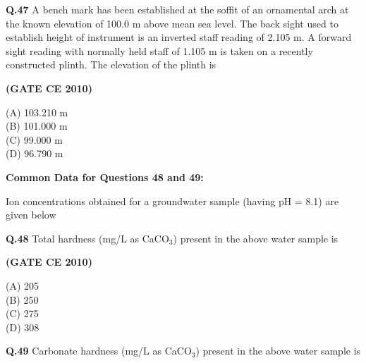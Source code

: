 \documentclass[journal,12pt,onecolumn]{exam}
\theoremstyle{remark}
\begin{document}
\noindent\textbf{Q.47} A bench mark has been established at the soffit of an ornamental arch at the known elevation of 100.0 m above mean sea level. The back sight used to establish height of instrument is an inverted staff reading of 2.105 m. A forward sight reading with normally held staff of 1.105 m is taken on a recently constructed plinth. The elevation of the plinth is

\setlength{\parskip}{0.5cm}

\hfill\textbf{(GATE CE 2010)}

\begin{multicols}{4}
\noindent(A) 103.210 m\\
(B) 101.000 m\\
(C) 99.000 m\\
(D) 96.790 m
\end{multicols}

\setlength{\parskip}{0.5cm}

\noindent\textbf{Common Data for Questions 48 and 49:}

\noindent Ion concentrations obtained for a groundwater sample (having pH = 8.1) are given below


\noindent\textbf{Q.48} Total hardness (mg/L as CaCO\(_3\)) present in the above water sample is

\setlength{\parskip}{0.5cm}

\hfill\textbf{(GATE CE 2010)}

\begin{multicols}{4}
\noindent(A) 205\\
(B) 250\\
(C) 275\\
(D) 308
\end{multicols}

\setlength{\parskip}{0.5cm}

\noindent\textbf{Q.49} Carbonate hardness (mg/L as CaCO\(_3\)) present in the above water sample is
\end{document}
